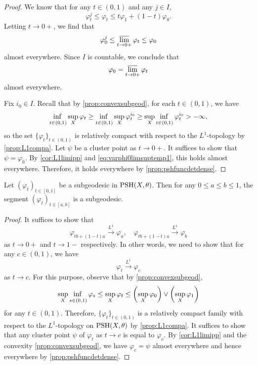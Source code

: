 \begin{proof}
    We know that for any $t\in (0,1)$ and any $j\in I$,
    \[
    \varphi^j_t\leq \varphi_t\leq t\varphi_1+(1-t)\varphi_0.
    \]
    Letting $t\to 0+$, we find that
    \[
    \varphi_0^j\leq \varlimsup_{t\to 0+}\varphi_t\leq \varphi_0
    \]
    almost everywhere. Since $I$ is countable, we conclude that
    \begin{equation}\label{eq:varphi0limsuptemp1}
    \varphi_0=\varlimsup_{t\to 0+}\varphi_t
    \end{equation}
    almost everywhere.

    Fix $i_0\in I$.
    Recall that by \cref{prop:convexsubgeod}, for each $t\in (0,1)$, we have
    \[
    \adjustlimits \inf_{t\in (0,1)}\sup_X \varphi_t\geq \adjustlimits\inf_{t\in (0,1)}\sup_X \varphi^{i_0}_t\geq \adjustlimits\sup_X \inf_{t\in (0,1)}\varphi^{i_0}_t>-\infty,
    \]
    so the set $\{\varphi_t\}_{t\in (0,1)}$ is relatively compact with respect to the $L^1$-topology by \cref{prop:L1compa}.
    Let $\psi$ be a cluster point as $t\to 0+$. It suffices to show that $\psi=\varphi_0$. By \cref{cor:L1limipp} and \eqref{eq:varphi0limsuptemp1}, this holds almost everywhere. Therefore, it holds everywhere by \cref{prop:pshfuncdetdense}.
\end{proof}

\begin{proposition}\label{prop:subgeodrestsubgeod}
    Let $(\varphi_t)_{t\in [0,1]}$ be a subgeodesic in $\mathrm{PSH}(X,\theta)$. Then for any $0\leq a\leq b\leq 1$, the segment $(\varphi_{t})_{t\in [a,b]}$ is a subgeodesic.
\end{proposition}



\begin{proof}
    It suffices to show that
    \[
    \varphi_{tb+(1-t)a}\xrightarrow{L^1}\varphi_a,\quad \varphi_{tb+(1-t)a}\xrightarrow{L^1}\varphi_b
    \]
    as $t\to 0+$ and $t\to 1-$ respectively. In other words, we need to show that for any $c\in (0,1)$, we have
    \[
    \varphi_t\xrightarrow{L^1}\varphi_c
    \]
    as $t\to c$. For this purpose, observe that by \cref{prop:convexsubgeod},
    \[
    \adjustlimits\sup_X \inf_{s\in (0,1)}\varphi_s\leq \sup_{X}\varphi_t\leq \left( \sup_X \varphi_0 \right) \lor \left( \sup_X\varphi_1 \right)
    \]
    for any $t\in (0,1)$. Therefore, $\{\varphi_t\}_{t\in (0,1)}$ is a relatively compact family with respect to the $L^1$-topology on $\mathrm{PSH}(X,\theta)$ by \cref{prop:L1compa}. It suffices to show that any cluster point $\psi$ of $\varphi_t$ as $t\to c$ is equal to $\varphi_c$.
    By \cref{cor:L1limipp} and the convexity \cref{prop:convexsubgeod}, we have $\varphi_c=\psi$ almost everywhere and hence everywhere by \cref{prop:pshfuncdetdense}.
\end{proof}

